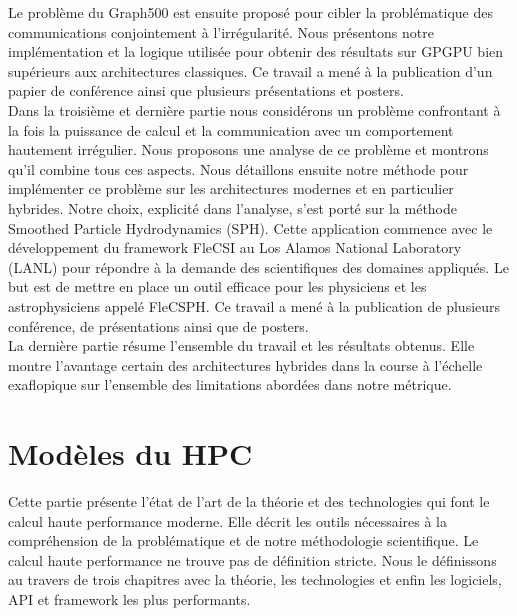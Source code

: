 \documentclass[12pt,a4paper]{report}
\begin{document}
Le problème du Graph500 est ensuite proposé pour cibler la problématique des communications conjointement à l'irrégularité. 
Nous présentons notre implémentation et la logique utilisée pour obtenir des résultats sur GPGPU bien supérieurs aux architectures classiques. 
Ce travail a mené à la publication d'un papier de conférence\cite{krajecki2016bfs} ainsi que plusieurs présentations et posters\cite{loiseau2015parcours,loiseau2015GTC}.\\

Dans la troisième et dernière partie nous considérons un problème confrontant à la fois la puissance de calcul et la communication avec un comportement hautement irrégulier. 
Nous proposons une analyse de ce problème et montrons qu'il combine tous ces aspects. 
Nous détaillons ensuite notre méthode pour implémenter ce problème sur les architectures modernes et en particulier hybrides. 
Notre choix, explicité dans l'analyse, s'est porté sur la méthode Smoothed Particle Hydrodynamics (SPH).
Cette application commence avec le développement du framework FleCSI au Los Alamos National Laboratory (LANL) pour répondre à la demande des scientifiques des domaines appliqués. 
Le but est de mettre en place un outil efficace pour les physiciens et les astrophysiciens appelé FleCSPH. 
Ce travail a mené à la publication de plusieurs conférence\cite{loiseau2018Flecsphg,loiseau2018CARLA}, de présentations ainsi que de posters\cite{debrye20162HOT,loiseau2017SC}.\\

La dernière partie résume l'ensemble du travail et les résultats obtenus. 
Elle montre l'avantage certain des architectures hybrides dans la course à l'échelle exaflopique sur l'ensemble des limitations abordées dans notre métrique.

\section{Modèles du HPC}
Cette partie présente l'état de l'art de la théorie et des technologies qui font le calcul haute performance moderne.
Elle décrit les outils nécessaires à la compréhension de la problématique et de notre méthodologie scientifique. 
Le calcul haute performance ne trouve pas de définition stricte. 
Nous le définissons au travers de trois chapitres avec la théorie, les technologies et enfin les logiciels, API et framework les plus performants. 
\end{document}
